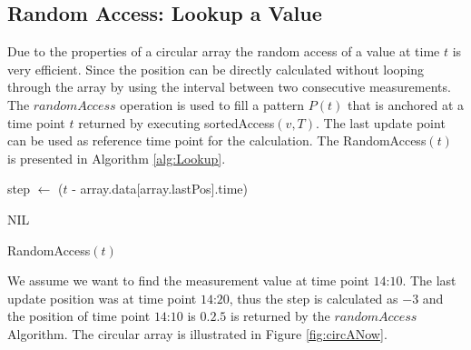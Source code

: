\documentclass[abstracton,12pt,oneside]{scrreprt}
\begin{document}
\subsection{Random Access: Lookup a Value}
Due to the properties of a circular array the random access of a value at time $t$ is very efficient. Since the position can be directly calculated without looping through the array by using the interval between two consecutive measurements. The $randomAccess$ operation is used to fill a pattern $P(t)$ that is anchored at a time point $t$ returned by executing sortedAccess$(v,T)$. The last update point can be used as reference time point for the calculation. The RandomAccess$(t)$ is presented in Algorithm \ref{alg:Lookup}.
\BlankLine
\begin{algorithm}[H]
	\IncMargin{1em}
	\SetAlgoLined
	\DontPrintSemicolon
	
	
	
	
	step $\leftarrow$ ($t$ - array.data[array.lastPos].time)\;
	
	
	\Return NIL\;
	
	
	
	
	\caption{RandomAccess$(t)$}	
	\label{alg:Lookup}
\end{algorithm}


\begin{exmp}
	We assume we want to find the measurement value at time point $\text{14:10}$. The last update position was at time point $\text{14:20}$, thus the step is calculated as $-3$ and the position of time point $\text{14:10}$ is $0$.$2.5$ is returned by the $randomAccess$ Algorithm. The circular array is illustrated in Figure \ref{fig:circANow}.   
\end{exmp}
\end{document}
